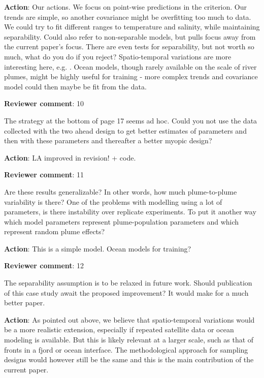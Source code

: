 \documentclass[a4paper]{article}
\def\revcom{\textbf{Reviewer comment}}
\def\action{\textbf{Action}}
\begin{document}
\begin{answers}
\action: Our actions. We focus on point-wise predictions in the criterion. Our trends are simple, so another covariance might be overfitting too much to data. We could try to fit different ranges to temperature and salinity, while maintaining separability. Could also refer to non-separable models, but pulls focus away from the current paper's focus. There are even tests for separability, but not worth so much, what do you do if you reject? Spatio-temporal variations are more interesting here, e.g. \cite{sigrist2015stochastic,richardson2017sparsity}. Ocean models, though rarely available on the scale of river plumes, might be highly useful for training - more complex trends and covariance model could then maybe be fit from the data. 

\item{\revcom:  10}\label{r1c10}

The strategy at the bottom of page 17 seems ad hoc. Could you not use the data collected with the two ahead design to get better estimates of parameters and then with these parameters and thereafter a better myopic design?

\action: LA improved in revision! + code. %

\item{\revcom:  11}\label{r1c11}

Are these results generalizable? In other words, how much plume-to-plume variability is there? One of the problems with modelling using a lot of parameters, is there instability over replicate experiments. To put it another way which model parameters represent plume-population parameters and which represent random plume effects?

\action: This is a simple model. Ocean models for training? 

\item{\revcom:  12}\label{r1c12}

The separability assumption is to be relaxed in future work. Should publication of this case study await the proposed improvement? It would make for a much better paper.

\action: As pointed out above, we believe that spatio-temporal variations would be a more realistic extension, especially if repeated satellite data or ocean modeling is available. But this is likely relevant at a larger scale, such as that of fronts in a fjord or ocean interface. The methodological approach for sampling designs would however still be the same and this is the main contribution of the current paper. 


\end{answers}
\end{document}
